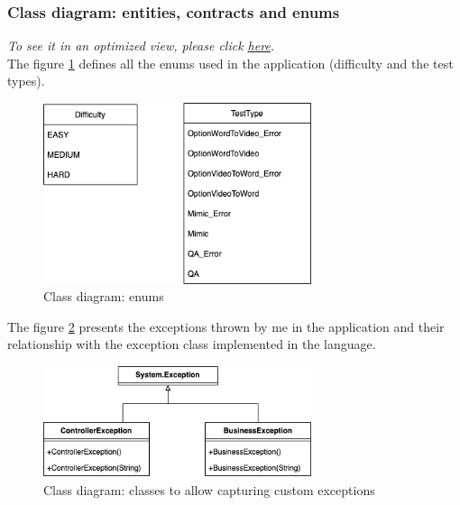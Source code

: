         \subsubsection{Class diagram: entities, contracts and enums}
            \textit{To see it in an optimized view, please click \href{https://github.com/JesusGonzalezA/LearnASLDoc/blob/master/doc/assets/diagrams/interfaces.png}{here}.} \\
            The figure \ref{fig:implementation_enums} defines all the enums used in the application (difficulty and the test types).
            \begin{figure}[H]
                \centering
                    \includegraphics[width=0.7\textwidth]{assets/diagrams/enums.png}
                \caption{Class diagram: enums}
                \label{fig:implementation_enums}
            \end{figure}

            The figure \ref{fig:implementation_exceptions_clasess} presents the exceptions thrown by me in the application and their relationship with 
            the exception class implemented in the language.
            \begin{figure}[H]
                \centering
                    \includegraphics[width=0.7\textwidth]{assets/diagrams/exceptions_classes.png}
                \caption{Class diagram: classes to allow capturing custom exceptions}
                \label{fig:implementation_exceptions_clasess}
            \end{figure}

